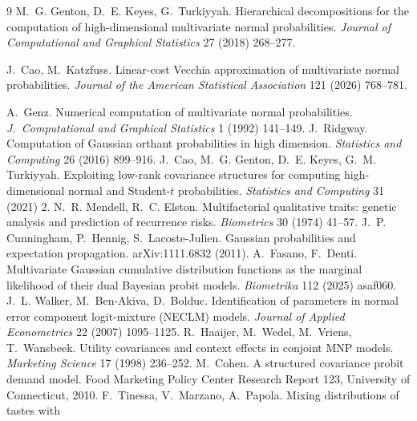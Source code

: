 \documentclass[12pt]{article}
\theoremstyle{remark}
\begin{document}
\begin{thebibliography}{9}
M.~G. Genton, D.~E. Keyes, G.~Turkiyyah. Hierarchical decompositions for
the computation of high-dimensional multivariate normal probabilities.
\emph{Journal of Computational and Graphical Statistics} 27 (2018)
268--277.

 J.~Cao, M.~Katzfuss.
Linear-cost Vecchia approximation of multivariate normal probabilities.
\emph{Journal of the American Statistical Association} 121 (2026)
768--781.

 A.~Genz. Numerical computation of multivariate normal
probabilities. \emph{J.\ Computational and Graphical Statistics} 1 (1992)
141--149.
 J.~Ridgway. Computation of Gaussian orthant
probabilities in high dimension. \emph{Statistics and Computing} 26 (2016)
899--916.
 J.~Cao, M.~G. Genton, D.~E. Keyes, G.~M. Turkiyyah.
Exploiting low-rank covariance structures for computing high-dimensional
normal and Student-$t$ probabilities. \emph{Statistics and Computing} 31
(2021) 2.
 N.~R. Mendell, R.~C. Elston. Multifactorial
qualitative traits: genetic analysis and prediction of recurrence risks.
\emph{Biometrics} 30 (1974) 41--57.
 J.~P. Cunningham, P.~Hennig, S.~Lacoste-Julien.
Gaussian probabilities and expectation propagation. arXiv:1111.6832 (2011).
 A.~Fasano, F.~Denti. Multivariate Gaussian
cumulative distribution functions as the marginal likelihood of their
dual Bayesian probit models. \emph{Biometrika} 112 (2025) asaf060.
J.~L. Walker, M.~Ben-Akiva, D.~Bolduc. Identification of parameters in
normal error component logit-mixture (NECLM) models. \emph{Journal of
Applied Econometrics} 22 (2007) 1095--1125.
 R.~Haaijer, M.~Wedel, M.~Vriens, T.~Wansbeek.
Utility covariances and context effects in conjoint MNP models.
\emph{Marketing Science} 17 (1998) 236--252.
 M.~Cohen. A structured covariance
probit demand model. Food Marketing Policy Center Research Report 123,
University of Connecticut, 2010.
F.~Tinessa, V.~Marzano, A.~Papola. Mixing distributions of tastes with

\end{thebibliography}
\end{document}
